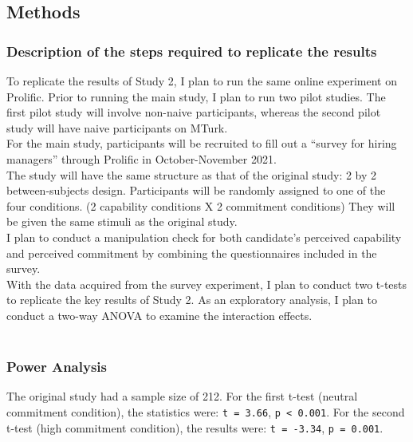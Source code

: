 \documentclass[]{article}
\begin{document}
\hypertarget{methods}{%
\subsection{Methods}\label{methods}}

\hypertarget{description-of-the-steps-required-to-replicate-the-results}{%
\subsubsection{Description of the steps required to replicate the
results}\label{description-of-the-steps-required-to-replicate-the-results}}

To replicate the results of Study 2, I plan to run the same online
experiment on Prolific. Prior to running the main study, I plan to run
two pilot studies. The first pilot study will involve non-naive
participants, whereas the second pilot study will have naive
participants on MTurk.\\
For the main study, participants will be recruited to fill out a
``survey for hiring managers'' through Prolific in October-November
2021.\\
The study will have the same structure as that of the original study: 2
by 2 between-subjects design. Participants will be randomly assigned to
one of the four conditions. (2 capability conditions X 2 commitment
conditions) They will be given the same stimuli as the original study.\\
I plan to conduct a manipulation check for both candidate's perceived
capability and perceived commitment by combining the questionnaires
included in the survey.\\
With the data acquired from the survey experiment, I plan to conduct two
t-tests to replicate the key results of Study 2. As an exploratory
analysis, I plan to conduct a two-way ANOVA to examine the interaction
effects.\\
~\\

\hypertarget{power-analysis}{%
\subsubsection{Power Analysis}\label{power-analysis}}

The original study had a sample size of 212. For the first t-test
(neutral commitment condition), the statistics were:
\texttt{t\ =\ 3.66}, \texttt{p\ \textless{}\ 0.001}. For the second
t-test (high commitment condition), the results were:
\texttt{t\ =\ -3.34}, \texttt{p\ =\ 0.001}.
\end{document}
